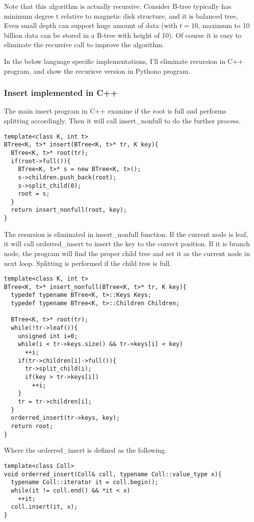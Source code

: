 \documentclass{article}
\begin{document}
Note that this algorithm is actually recursive. Consider B-tree typically
has minimum degree t relative to magnetic disk structure, and it is balanced 
tree, Even small depth can support huge amount of data 
(with $t=10$, maximum to 10 billion data can be stored in a B-tree with height of 10).
Of course it is easy to eliminate the recursive call to improve the algorithm.

In the below language specific implementations, I'll eliminate recursion in 
C++ program, and show the recurisve version in Pythono program.

\subsubsection*{Insert implemented in C++}
The main insert program in C++ examine if the root is full and performs splitting
accordingly. Then it will call insert\_nonfull to do the further process.

\lstset{language=C++}
\begin{lstlisting}
template<class K, int t>
BTree<K, t>* insert(BTree<K, t>* tr, K key){
  BTree<K, t>* root(tr);
  if(root->full()){
    BTree<K, t>* s = new BTree<K, t>();
    s->children.push_back(root);
    s->split_child(0);
    root = s;
  }
  return insert_nonfull(root, key);
}
\end{lstlisting}

The resursion is eliminated in insert\_nonfull function. If the current
node is leaf, it will call orderred\_insert to insert the key to the correct
position. If it is branch node, the program will find the proper child
tree and set it as the current node in next loop. Splitting is performed
if the child tree is full.

\begin{lstlisting}
template<class K, int t>
BTree<K, t>* insert_nonfull(BTree<K, t>* tr, K key){
  typedef typename BTree<K, t>::Keys Keys;
  typedef typename BTree<K, t>::Children Children;

  BTree<K, t>* root(tr);
  while(!tr->leaf()){
    unsigned int i=0;
    while(i < tr->keys.size() && tr->keys[i] < key)
      ++i;
    if(tr->children[i]->full()){
      tr->split_child(i);
      if(key > tr->keys[i])
        ++i;
    }
    tr = tr->children[i];
  }
  orderred_insert(tr->keys, key);
  return root;
}
\end{lstlisting}

Where the orderred\_insert is defined as the following.

\begin{lstlisting}
template<class Coll>
void orderred_insert(Coll& coll, typename Coll::value_type x){
  typename Coll::iterator it = coll.begin();
  while(it != coll.end() && *it < x)
    ++it;
  coll.insert(it, x);
}
\end{lstlisting}
\end{document}
